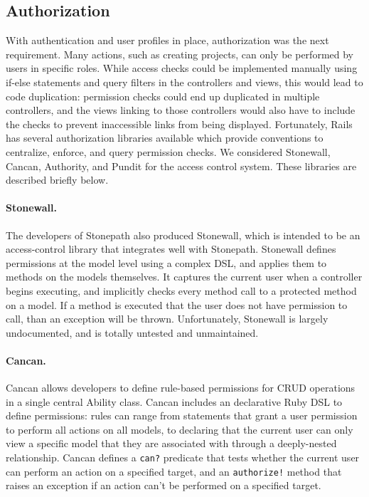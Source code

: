 \documentclass[document.tex]{subfiles}
\begin{document}
\FloatBarrier

\subsection{Authorization}


With authentication and user profiles in place, authorization was the next requirement. Many actions, such as creating projects, can only be performed by users in specific roles. While access checks could be implemented manually using if-else statements and query filters in the controllers and views, this would lead to code duplication: permission checks could end up duplicated in multiple controllers, and the views linking to those controllers would also have to include the checks to prevent inaccessible links from being displayed. Fortunately, Rails has several authorization libraries available which provide conventions to centralize, enforce, and query permission checks. We considered Stonewall, Cancan, Authority, and Pundit for the access control system. These libraries are described briefly below.

\paragraph{Stonewall.} The developers of Stonepath also produced Stonewall, which is intended to be an access-control library that integrates well with Stonepath. Stonewall defines permissions at the model level using a complex DSL, and applies them to methods on the models themselves. It captures the current user when a controller begins executing, and implicitly checks every method call to a protected method on a model. If a method is executed that the user does not have permission to call, than an exception will be thrown. Unfortunately, Stonewall is largely undocumented, and is totally untested and unmaintained.

\paragraph{Cancan.} Cancan allows developers to define rule-based permissions for CRUD operations in a single central Ability class. Cancan includes an declarative Ruby DSL to define permissions: rules can range from statements that grant a user permission to perform all actions on all models, to declaring that the current user can only view a specific model that they are associated with through a deeply-nested relationship. Cancan defines a \verb!can?! predicate that tests whether the current user can perform an action on a specified target, and an \verb|authorize!| method that raises an exception if an action can’t be performed on a specified target.
\end{document}

